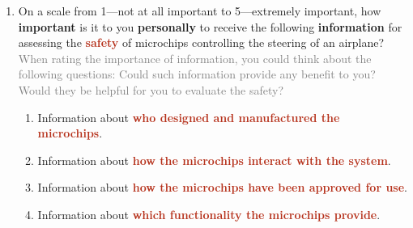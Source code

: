 \begin{enumerate}
\begin{enumerate}
            \item \label{xhw_study::question::v0_information}
                On a scale from 1---not at all important to 5---extremely important, how \textbf{important} is it to you \textbf{personally} to receive the following \textbf{information} for assessing the \textbf{\textcolor[HTML]{B6321C}{safety}} of microchips controlling the steering of an airplane?\\
                \textcolor{gray}{\infosymbol When rating the importance of information, you could think about the following questions: Could such information provide any benefit to you? Would they be helpful for you to evaluate the safety?}
            \begin{enumerate}
                \item \label{xhw_study::question::v0_information_who_manucatured}
                    Information about \textbf{\textcolor[HTML]{B6321C}{who designed and manufactured the microchips}}.
                \item \label{xhw_study::question::v0_information_how_interact}
                    Information about \textbf{\textcolor[HTML]{B6321C}{how the microchips interact with the system}}.
                \item \label{xhw_study::question::v0_information_how_approved}
                    Information about \textbf{\textcolor[HTML]{B6321C}{how the microchips have been approved for use}}.
                \item \label{xhw_study::question::v0_information_which_functionality}
                    Information about \textbf{\textcolor[HTML]{B6321C}{which functionality the microchips provide}}.

\end{enumerate}
\end{enumerate}
\end{enumerate}
